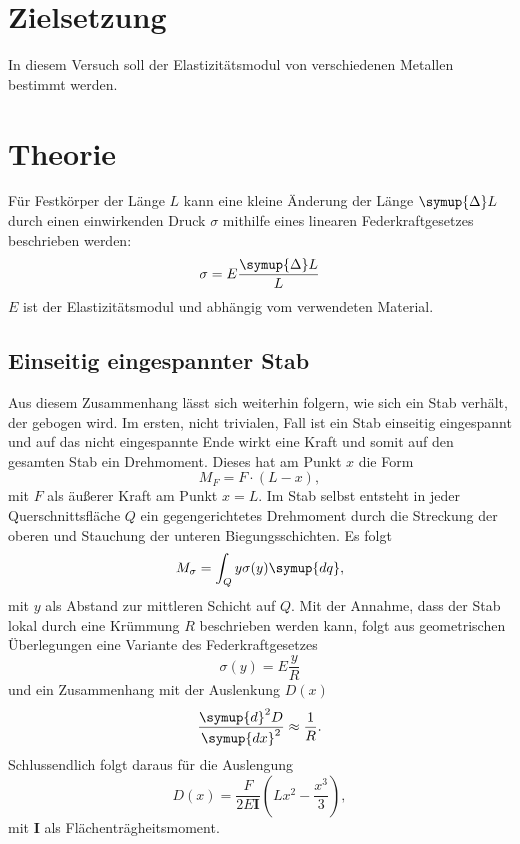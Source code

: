 \section{Zielsetzung}
In diesem Versuch soll der Elastizitätsmodul von verschiedenen Metallen bestimmt werden.
\section{Theorie}
\label{sec:Theorie}
Für Festkörper der Länge $L$ kann eine kleine Änderung der Länge $\symup{\Delta}L$ 
durch einen einwirkenden Druck $\sigma$
mithilfe eines linearen Federkraftgesetzes beschrieben werden:
\begin{equation}
    \sigma = E\frac{\symup{\Delta}L}{L}
\end{equation}
$E$ ist der Elastizitätsmodul und abhängig vom verwendeten Material.
\subsection{Einseitig eingespannter Stab}
Aus diesem Zusammenhang lässt sich weiterhin folgern, wie sich ein Stab verhält, der gebogen wird.
Im ersten, nicht trivialen, Fall ist ein Stab einseitig eingespannt und auf das nicht eingespannte 
Ende wirkt eine Kraft und somit auf den gesamten Stab ein Drehmoment.
Dieses hat am Punkt $x$ die Form
\begin{equation}
    M_F = F\cdot(L-x),
\end{equation}
mit $F$ als äußerer Kraft am Punkt $x=L$.
Im Stab selbst entsteht in jeder Querschnittsfläche $Q$ ein gegengerichtetes Drehmoment durch die 
Streckung der oberen und Stauchung der unteren Biegungsschichten.
Es folgt
\begin{equation}
    M_\sigma = \int_Q y \sigma(y) \symup{dq},
\end{equation}
mit $y$ als Abstand zur mittleren Schicht auf $Q$.
Mit der Annahme, dass der Stab lokal durch eine Krümmung $R$ beschrieben werden kann,
folgt aus geometrischen Überlegungen eine Variante des Federkraftgesetzes
\begin{equation}
    \sigma(y) = E\frac{y}{R}
\end{equation}
und ein Zusammenhang mit der Auslenkung $D(x)$
\begin{equation}
    \frac{\symup{d}^2D}{\symup{dx}^2} \approx \frac{1}{R}.
\end{equation}
Schlussendlich folgt daraus für die Auslengung
\begin{equation}
    D(x) = \frac{F}{2E\symbf{I}}\left(Lx^2-\frac{x^3}{3}\right),
\end{equation}
mit $\symbf{I}$ als Flächenträgheitsmoment.
